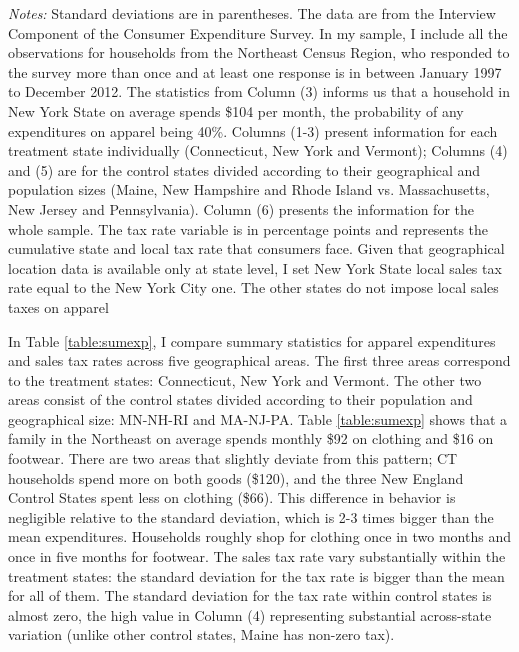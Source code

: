 \documentclass[12pt]{article}
\begin{document}
\begin{table}
\begin{threeparttable}
\begin{tablenotes}
				\small \emph{Notes:} Standard deviations are in parentheses. The data are from the Interview Component of the Consumer Expenditure Survey. In my sample, I include all the observations for households from the Northeast Census Region, who responded to the survey more than once and at least one response is in between January 1997 to December 2012. The statistics from Column (3) informs us that a household in New York State on average spends \$104 per month, the probability of any expenditures on apparel being 40\%. Columns (1-3) present information for each treatment state individually (Connecticut, New York and Vermont); Columns (4) and (5) are for the control states divided according to their geographical and population sizes (Maine, New Hampshire and Rhode Island vs. Massachusetts, New Jersey and Pennsylvania). Column (6) presents the information for the whole sample. The tax rate variable is in percentage points and represents the cumulative state and local tax rate that consumers face. Given that geographical location data is available only at state level, I set New York State local sales tax rate equal to the New York City one. The other states do not impose local sales taxes on apparel
			\end{tablenotes}
		\end{threeparttable}
	\end{table}
	
	In Table \ref{table:sumexp}, I compare summary statistics for apparel expenditures and sales tax rates across five geographical areas. The first three areas correspond to the treatment states: Connecticut, New York and Vermont. The other two areas consist of the control states divided according to their population and geographical size: MN-NH-RI and MA-NJ-PA. Table \ref{table:sumexp} shows that a family in the Northeast on average spends monthly \$92 on clothing and \$16 on footwear. There are two areas that slightly deviate from this pattern; CT households spend more on both goods (\$120), and the three New England Control States spent less on clothing (\$66). This difference in behavior is negligible relative to the standard deviation, which is 2-3 times bigger than the mean expenditures. Households roughly shop for clothing once in two months and once in five months for footwear. The sales tax rate vary substantially within the treatment states: the standard deviation for the tax rate is bigger than the mean for all of them. The standard deviation for the tax rate within control states is almost zero, the high value in Column (4) representing substantial across-state variation (unlike other control states, Maine has non-zero tax).
	
\end{document}
